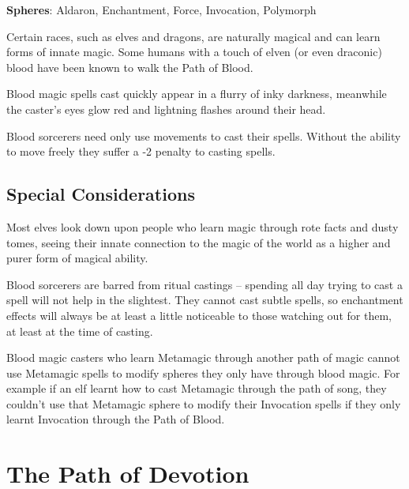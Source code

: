 \begin{multicols}{2}

\textbf{Spheres}: Aldaron, Enchantment, Force, Invocation, Polymorph

\noindent Certain races, such as elves and dragons, are naturally magical and can learn forms of innate magic. Some humans with a touch of elven (or even draconic) blood have been known to walk the Path of Blood.

Blood magic spells cast quickly appear in a flurry of inky darkness, meanwhile the caster's eyes glow red and lightning flashes around their head.

Blood sorcerers need only use movements to cast their spells. Without the ability to move freely they suffer a -2 penalty to casting spells.

\subsection{Special Considerations}

Most elves look down upon people who learn magic through rote facts and dusty tomes, seeing their innate connection to the magic of the world as a higher and purer form of magical ability.

Blood sorcerers are barred from ritual castings -- spending all day trying to cast a spell will not help in the slightest. They cannot cast subtle spells, so enchantment effects will always be at least a little noticeable to those watching out for them, at least at the time of casting.

Blood magic casters who learn Metamagic through another path of magic cannot use Metamagic spells to modify spheres they only have through blood magic.
For example if an elf learnt how to cast Metamagic through the path of song, they couldn't use that Metamagic sphere to modify their Invocation spells if they only learnt Invocation through the Path of Blood.

\end{multicols}

\section{The Path of Devotion}

